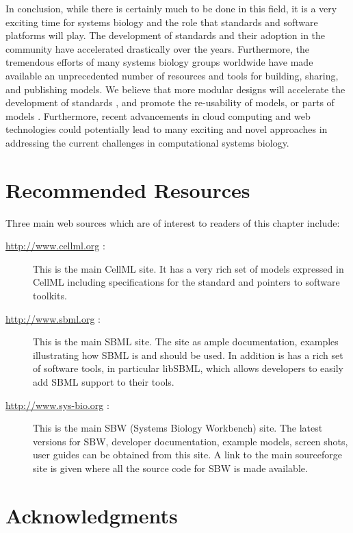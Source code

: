 \documentclass[]{article}
\begin{document}
In conclusion, while there is certainly much to be done in this field,
it is a very exciting time for systems biology and the role that
standards and software platforms will play. The development of standards
and their adoption in the community have accelerated drastically over
the years. Furthermore, the tremendous efforts of many systems biology
groups worldwide have made available an unprecedented number of
resources and tools for building, sharing, and publishing models. We
believe that more modular designs will accelerate the development of
standards \autocite{hucka2010systems}, and promote the re-usability of
models, or parts of models \autocite{neal2012sbml}. Furthermore, recent
advancements in cloud computing and web technologies could potentially
lead to many exciting and novel approaches in addressing the current
challenges in computational systems biology.

\section{Recommended Resources}

Three main web sources which are of interest to readers of this chapter
include:

\begin{description}
\item[\url{http://www.cellml.org} :]
This is the main CellML site. It has a very rich set of models expressed
in CellML including specifications for the standard and pointers to
software toolkits.

\item[\url{http://www.sbml.org} :]
This is the main SBML site. The site as ample documentation, examples
illustrating how SBML is and should be used. In addition is has a rich
set of software tools, in particular libSBML, which allows developers to
easily add SBML support to their tools.

\item[\url{http://www.sys-bio.org} :]
This is the main SBW (Systems Biology Workbench) site. The latest
versions for SBW, developer documentation, example models, screen shots,
user guides can be obtained from this site. A link to the main
sourceforge site is given where all the source code for SBW is made
available.

\end{description}
\section{Acknowledgments}
\end{document}
